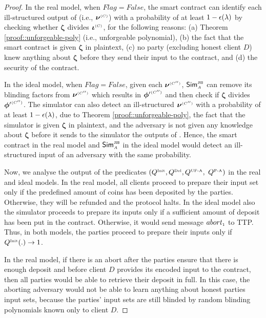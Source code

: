 \begin{proof}
In the real model, when $Flag=False$, the smart contract can identify each ill-structured output of \vopr (i.e.,  $\bm\nu^{ \scriptscriptstyle {  {(C)}} }$) with a probability of at least $1-\epsilon(\lambda)$ by checking whether $\bm\zeta$  divides $\bm\iota^{ \scriptscriptstyle {  {(C)}}}$, for the following reasons:  (a) Theorem \ref{proof::unforgeable-poly} (i.e., unforgeable polynomial), (b) the fact that the smart contract is given $\bm \zeta$ in plaintext, (c) no party (excluding honest client $D$) knew anything about $\bm \zeta$ before they send their input to the contract, and (d) the security of the contract. 

In the ideal model, when $Flag=False$, given each $ {\bm\nu}^{ \scriptscriptstyle {  {(C'')}} }$, $\mathsf{Sim}^{\scriptscriptstyle \mathtt{JUS}}_{\scriptscriptstyle A}$ can remove its blinding factors from  $ {\bm\nu}^{ \scriptscriptstyle {  {(C'')}} }$ which results in $ {\bm\phi'}^{ \scriptscriptstyle {  {(C'')}} }$ and then check if $ {\bm\zeta}$  divides $ {\bm\phi'}^{ \scriptscriptstyle {  {(C'')}} }$. The simulator can also detect an ill-structured  $ {\bm\nu}^{ \scriptscriptstyle {  {(C'')}} }$ with a probability of at least $1-\epsilon(\lambda)$, due to Theorem \ref{proof::unforgeable-poly}, the fact that the simulator is given $ {\bm \zeta}$ in plaintext,  and the adversary is not given any knowledge about $ {\bm \zeta}$ before it sends to the simulator the outputs of \vopr.  Hence, the smart contract in the real model and $\mathsf{Sim}^{\scriptscriptstyle \mathtt{JUS}}_{\scriptscriptstyle A}$ in the ideal model would detect an ill-structured input of an adversary with the same probability. 



Now, we analyse the output of the predicates $(Q^{\scriptscriptstyle \text{Init}}, Q^{\scriptscriptstyle \text{Del}}, Q^{\scriptscriptstyle \text{UF-A}}, $ $Q^{\scriptscriptstyle \text{F-A}})$ in the real and ideal models. In the real model, all clients proceed to prepare their input set only if the predefined amount of coins has been deposited by the parties. Otherwise, they will be refunded and the protocol halts. In the ideal model also the simulator proceeds to prepare its inputs only if a sufficient amount of deposit has been put in the contract.  Otherwise, it would send message $abort_{\scriptscriptstyle 1}$ to TTP. Thus, in both models, the parties proceed to prepare their inputs only if $Q^{\scriptscriptstyle \text{Init}}(.) \rightarrow1$. 

In the real model, if there is an abort after the parties ensure that there is enough deposit and before client $D$ provides its encoded input to the contract, then all parties would be able to retrieve their deposit in full. In this case, the aborting adversary would not be able to learn anything about honest parties input sets, because the parties' input sets are still blinded by random blinding polynomials known only to client $D$. 


\end{proof}
